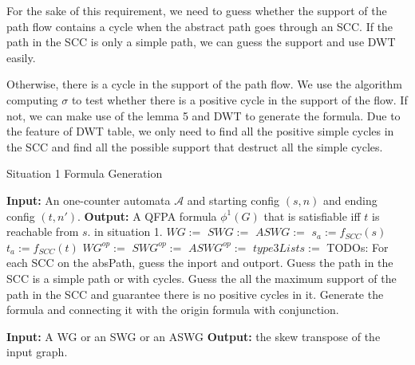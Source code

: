 \documentclass{article}
\begin{document}
\begin{itemize}
For the sake of this requirement, we need to guess whether  the support of the path flow contains a cycle when the abstract path goes through an SCC. If the path in the SCC is only a simple path, we can guess the support and use DWT easily. 

Otherwise, there is a cycle in the support of the path flow. We use the algorithm computing $\sigma$ to test whether there is a positive cycle in the support of the flow. If not, we can make use of the lemma 5 and DWT to generate the formula. Due to the feature of DWT table, we only need to find all the positive simple cycles in the SCC and find all the possible support that destruct all the simple cycles.



\begin{algorithm}

	\caption{Situation 1 Formula Generation}
	\begin{algorithmic}
		
		
			\State \textbf{Input:} An one-counter automata $\mathcal{A}$ and starting config $(s,n)$ and ending config $(t,n')$.
			\State \textbf{Output:} A QFPA formula $\phi^1(G)$ that is satisfiable iff $t$ is reachable from $s$. in situation 1.
			\State $WG :=$ 
			\State $SWG :=$ 
			\State $ASWG :=$ 
			\State $s_a := f_{SCC}(s)$ 
			\State $t_a := f_{SCC}(t)$ 
			\State $WG^{op} := $
			\State $SWG^{op} := $
			\State $ASWG^{op} := $
			\State $type3Lists :=$ 
							\State TODOs: 
							\State For each SCC on the absPath, guess the inport and outport.
							\State Guess the path in the SCC is a simple path or with cycles.
							\State Guess the all the maximum support of the path in the SCC and guarantee there is no positive cycles in it.
							\State Generate the formula and connecting it with the origin formula with conjunction.
						\EndFor
						
					\EndFor	
				\EndFor
			\EndFor
		\EndFunction
		
		
		\State{}
			\State \textbf{Input:} A WG or an SWG or an ASWG 
			\State \textbf{Output:} the skew transpose of the input graph.
			
		
		\EndFunction
		

\end{algorithmic}
\end{algorithm}
\end{itemize}
\end{document}
